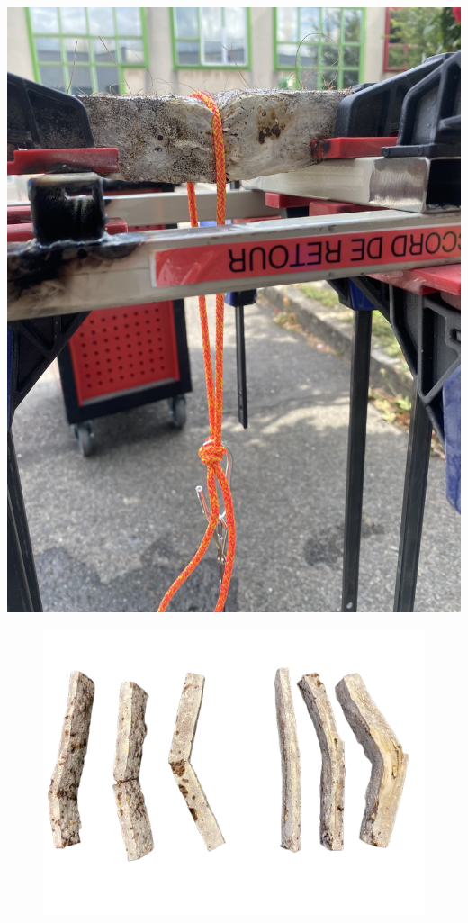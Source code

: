 \begin{marginfigure}
    \centering
    \includegraphics{images/IMG_3432.jpg}
    \caption{}
    \label{fig:mech2}
\end{marginfigure}

\begin{figure}[h]
    \centering
    \includegraphics{images/IMG_1823-removebg-preview.png}
    \caption{}
    \label{fig:eprouvette}
\end{figure} 

